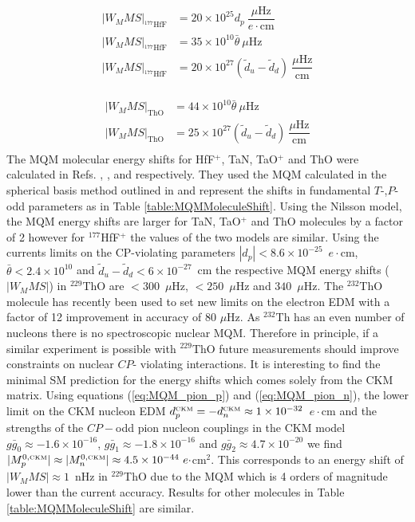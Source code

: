 \documentclass[10pt,a4paper, twoside, openright]{report}
\begin{document}
\begin{align*}
\left|W_M M S\right|_{^{177}\text{HfF}} &= 20 \times 10^{25}d_p \ \dfrac{\mu \text{Hz}}{  e\cdot \text{cm}} \\
\left|W_M M S\right|_{^{177}\text{HfF}} &= 35 \times 10^{10}\bar{\theta}  \ \mu \text{Hz} \\ 
\left|W_M M S\right|_{^{177}\text{HfF}} &= 20 \times 10^{27}(\tilde{d}_{u} - \tilde{d}_d) \  \dfrac{\mu \text{Hz}}{  \text{cm}} \\
\end{align*}

\begin{align*}
\left|W_M M S\right|_{\text{ThO}} &= 44 \times 10^{10}\bar{\theta}  \ \mu \text{Hz} \\ 
\left|W_M M S\right|_{\text{ThO}} &= 25 \times 10^{27}(\tilde{d}_{u} - \tilde{d}_d) \  \dfrac{\mu \text{Hz}}{  \text{cm}} \\
\end{align*}
\fi
The MQM molecular energy shifts for HfF$^+$, TaN, TaO$^{+}$ and ThO were calculated in Refs. \cite{Skripnikov2017Hf}, \cite{Skripnikov2015Ta}, \cite{Fleig2018} and \cite{Skripnikov2014ThO} respectively. They used the MQM calculated in  the spherical basis method outlined in \cite{Flambaum2014} and represent the shifts in fundamental $T$-,$P$- odd parameters as in Table \ref{table:MQMMoleculeShift}. Using the Nilsson model, the MQM energy shifts are larger for TaN, TaO$^+$ and ThO molecules by a factor of 2 however for $^{177}$HfF$^+$ the values of the two models are similar. Using the currents limits on the CP-violating parameters \cite{Swallows2013} $|d_p| < 8.6 \times 10^{-25}$~$e\cdot$cm, $\bar{\theta} < 2.4 \times 10^{10}$ and $\tilde{d}_{u} - \tilde{d}_d < 6\times 10^{-27}$~cm the respective MQM energy shifts ($\left|W_M M S\right|$) in $^{229}$ThO are $<300$~$\mu$Hz, $<250$~$\mu$Hz and $340$~$\mu$Hz. The $^{232}$ThO molecule has recently been used to set new limits on the electron EDM with a factor of 12 improvement in accuracy of 80 $\mu$Hz\cite{ACME2014,ACME2018}. As $^{232}$Th has an even number of nucleons there is no spectroscopic nuclear MQM. Therefore in principle, if a similar experiment is possible with $^{229}$ThO future measurements should improve constraints on nuclear $CP$- violating interactions. It is interesting to find the minimal SM prediction for the energy shifts which comes solely from the CKM matrix. Using equations (\ref{eq:MQM_pion_p}) and (\ref{eq:MQM_pion_n}), the lower limit on the CKM nucleon EDM $d_{p}^{\text{{\tiny CKM}}} = -d_{n}^{\text{{\tiny CKM}}} \approx 1 \times 10^{-32}$~$e\cdot$cm\cite{Seng2015} and the strengths of the $CP-$odd pion  nucleon couplings in the CKM model $g\bar{g}_0 \approx -1.6 \times 10^{-16}$, $g\bar{g}_1 \approx -1.8 \times 10^{-16}$ and $g\bar{g}_2 \approx 4.7\times 10^{-20}$ \cite{Yamanaka2016} we find $|M_{p}^{0,\text{{\tiny CKM}}}|\approx |M_{n}^{0,\text{{\tiny CKM}}}| \approx 4.5 \times 10^{-44} \ e\cdot$cm$^2$. This corresponds to an energy shift of $|W_MMS| \approx 1$~nHz in $^{229}$ThO due to the MQM which is 4 orders of magnitude lower than the current accuracy. Results for other molecules in Table \ref{table:MQMMoleculeShift} are similar.
\end{document}
